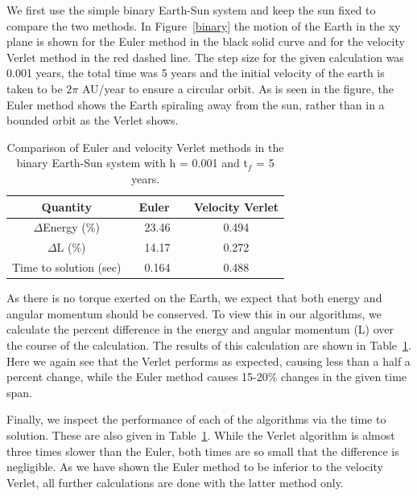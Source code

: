 \documentclass[prc,amsmath,twocolumn,superscriptaddress]{revtex4}
\begin{document}
We first use the simple binary Earth-Sun system and keep the sun fixed to compare the two methods. In Figure~\ref{binary} the motion of the Earth in the xy plane is shown for the Euler method in the black solid curve and for the velocity Verlet method in the red dashed line. The step size for the given calculation was 0.001 years, the total time was 5 years and the initial velocity of the earth is taken to be $2\pi$ AU/year to ensure a circular orbit. As is seen in the figure, the Euler method shows the Earth spiraling away from the sun, rather than in a bounded orbit as the Verlet shows. 
\begin{table}[t]
\centering
\begin{tabular}{|c|c|c|}
\hline
Quantity&~Euler~~&Velocity Verlet\\
\hline
$\Delta$Energy (\%)&23.46&0.494\\
$\Delta$L (\%)&14.17&0.272\\
Time to solution (sec)&0.164&0.488\\
\hline
\end{tabular}
\caption{Comparison of Euler and velocity Verlet methods in the binary Earth-Sun system with h = 0.001 and t$_{f}$ = 5 years.}
\label{nrg}
\end{table}
As there is no torque exerted on the Earth, we expect that both energy and angular momentum should be conserved. To view this in our algorithms, we calculate the percent difference in the energy and angular momentum (L) over the course of the calculation. The results of this calculation are shown in Table~\ref{nrg}. Here we again see that the Verlet performs as expected, causing less than a half a percent change, while the Euler method causes 15-20\% changes in the given time span.

Finally, we inspect the performance of each of the algorithms via the time to solution. These are also given in Table~\ref{nrg}. While the Verlet algorithm is almost three times slower than the Euler, both times are so small that the difference is negligible. As we have shown the Euler method to be inferior to the velocity Verlet, all further calculations are done with the latter method only.
\end{document}
